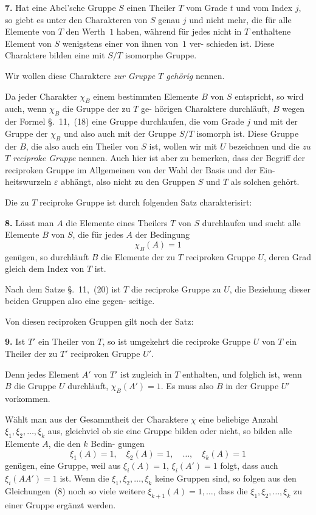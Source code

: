 \documentclass[12pt,a4paper]{article}
\theoremstyle{plain}
\theoremstyle{definition}
\theoremstyle{remark}
\begin{document}
\textbf{7.} Hat eine Abel'sche Gruppe $S$ einen Theiler $T$
vom Grade $t$ und vom Index $j$, so giebt es unter
den Charakteren von $S$ genau $j$ und nicht mehr,
die für alle Elemente von $T$ den Werth~$1$ haben,
während für jedes nicht in $T$ enthaltene Element
von $S$ wenigstens einer von ihnen von~$1$ ver-
schieden ist. Diese Charaktere bilden eine mit
$S/T$ isomorphe Gruppe.

Wir wollen diese Charaktere \emph{zur Gruppe $T$ gehörig}
nennen.

Da jeder Charakter $\chi_B$ einem bestimmten Elemente $B$ von $S$
entspricht, so wird auch, wenn $\chi_B$ die Gruppe der zu $T$ ge-
hörigen Charaktere durchläuft, $B$ wegen der Formel \S.~11,~(18)
eine Gruppe durchlaufen, die vom Grade $j$ und mit der Gruppe
der $\chi_B$ und also auch mit der Gruppe $S/T$ isomorph ist. Diese
Gruppe der $B$, die also auch ein Theiler von $S$ ist, wollen wir
mit $U$ bezeichnen und die \emph{zu $T$ reciproke Gruppe} nennen.
Auch hier ist aber zu bemerken, dass der Begriff der reciproken
Gruppe im Allgemeinen von der Wahl der Basis und der Ein-
heitswurzeln $\varepsilon$ abhängt, also nicht zu den Gruppen $S$ und $T$ als
solchen gehört.

Die zu $T$ reciproke Gruppe ist durch folgenden Satz
charakterisirt:

\textbf{8.} Lässt man $A$ die Elemente eines Theilers $T$ von
$S$ durchlaufen und sucht alle Elemente $B$ von $S$,
die für jedes $A$ der Bedingung
\begin{equation}\tag{7}
\chi_B(A) = 1
\end{equation}
genügen, so durchläuft $B$ die Elemente der zu $T$
reciproken Gruppe $U$, deren Grad gleich dem
Index von $T$ ist.

Nach dem Satze \S.~11,~(20) ist $T$ die reciproke Gruppe
zu $U$, die Beziehung dieser beiden Gruppen also eine gegen-
seitige.

Von diesen reciproken Gruppen gilt noch der Satz:

\textbf{9.} Ist $T'$ ein Theiler von $T$, so ist umgekehrt die
reciproke Gruppe $U$ von $T$ ein Theiler der zu $T'$
reciproken Gruppe $U'$.

Denn jedes Element $A'$ von $T'$ ist zugleich in $T$ enthalten,
und folglich ist, wenn $B$ die Gruppe $U$ durchläuft, $\chi_B(A') = 1$.
Es muss also $B$ in der Gruppe $U'$ vorkommen.

Wählt man aus der Gesammtheit der Charaktere $\chi$ eine
beliebige Anzahl $\xi_1, \xi_2, \ldots, \xi_k$ aus, gleichviel ob sie eine Gruppe
bilden oder nicht, so bilden alle Elemente $A$, die den $k$ Bedin-
gungen
\begin{equation}\tag{8}
\xi_1(A) = 1, \quad \xi_2(A) = 1, \quad \ldots, \quad \xi_k(A) = 1
\end{equation}
genügen, eine Gruppe, weil aus $\xi_i(A) = 1$, $\xi_i(A') = 1$ folgt, dass
auch $\xi_i(AA') = 1$ ist. Wenn die $\xi_1, \xi_2, \ldots, \xi_k$ keine Gruppen
sind, so folgen aus den Gleichungen~(8) noch so viele weitere
$\xi_{k+1}(A) = 1, \ldots$, dass die $\xi_1, \xi_2, \ldots, \xi_k$ zu einer Gruppe ergänzt
werden.
\end{document}
